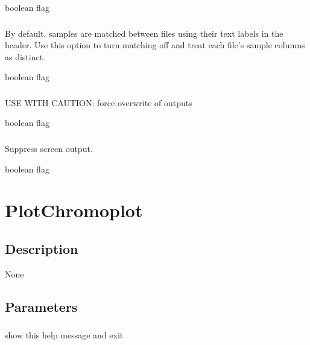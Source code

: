 \documentclass[letterpaper,11pt,english]{sphinxmanual}
\begin{document}
 boolean flag


\subsubsection{}
\label{\detokenize{prog_desc:newsamples}}
 By default, samples are matched between files using their text labels in the header. Use this option to turn matching off and treat each file’s sample columns as distinct.

 boolean flag


\subsubsection{}
\label{\detokenize{prog_desc:id125}}
 USE WITH CAUTION: force overwrite of outputs

 boolean flag


\subsubsection{}
\label{\detokenize{prog_desc:id126}}
 Suppress screen output.

 boolean flag


\section{PlotChromoplot}
\label{\detokenize{prog_desc:plotchromoplot}}

\subsection{Description}
\label{\detokenize{prog_desc:id127}}
None


\subsection{Parameters}
\label{\detokenize{prog_desc:id128}}

\subsubsection{}
\label{\detokenize{prog_desc:id129}}
 show this help message and exit
\end{document}
